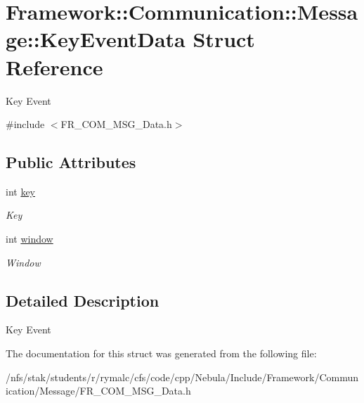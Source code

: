 \hypertarget{structFramework_1_1Communication_1_1Message_1_1KeyEventData}{
\section{Framework::Communication::Message::KeyEventData Struct Reference}
\label{structFramework_1_1Communication_1_1Message_1_1KeyEventData}
}


Key Event  


{\ttfamily \#include $<$FR\_\-COM\_\-MSG\_\-Data.h$>$}\subsection*{Public Attributes}
\begin{DoxyCompactItemize}
\item 
\hypertarget{structFramework_1_1Communication_1_1Message_1_1KeyEventData_a6e1b755d32a9b6268d5cccabe99f07a6}{
int \hyperlink{structFramework_1_1Communication_1_1Message_1_1KeyEventData_a6e1b755d32a9b6268d5cccabe99f07a6}{key}}
\label{structFramework_1_1Communication_1_1Message_1_1KeyEventData_a6e1b755d32a9b6268d5cccabe99f07a6}

\begin{DoxyCompactList}\small\item\em Key \item\end{DoxyCompactList}\item 
\hypertarget{structFramework_1_1Communication_1_1Message_1_1KeyEventData_a72614918d96389e8dc7372f85b0425e1}{
int \hyperlink{structFramework_1_1Communication_1_1Message_1_1KeyEventData_a72614918d96389e8dc7372f85b0425e1}{window}}
\label{structFramework_1_1Communication_1_1Message_1_1KeyEventData_a72614918d96389e8dc7372f85b0425e1}

\begin{DoxyCompactList}\small\item\em Window \item\end{DoxyCompactList}\end{DoxyCompactItemize}


\subsection{Detailed Description}
Key Event 

The documentation for this struct was generated from the following file:\begin{DoxyCompactItemize}
\item 
/nfs/stak/students/r/rymalc/cfs/code/cpp/Nebula/Include/Framework/Communication/Message/FR\_\-COM\_\-MSG\_\-Data.h\end{DoxyCompactItemize}
